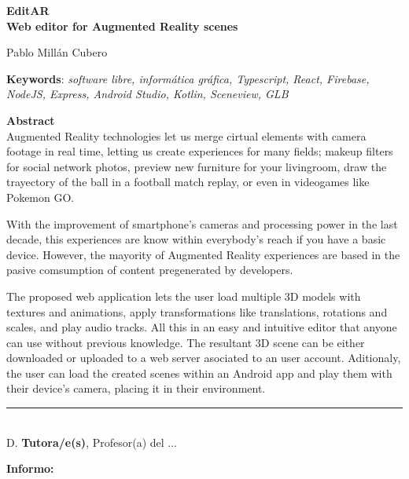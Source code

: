 \cleardoublepage

\begin{center}
	{\large\bfseries EditAR \\ Web editor for Augmented Reality scenes}\\
\end{center}
\begin{center}
	Pablo Millán Cubero\\
\end{center}
\vspace{0.5cm}
\noindent\textbf{Keywords}: \textit{software libre, informática gráfica, Typescript, React, Firebase, NodeJS, Express, Android Studio, Kotlin, Sceneview, GLB}
\vspace{0.7cm}

\noindent\textbf{Abstract}\\
Augmented Reality technologies let us merge cirtual elements with camera footage in real time, letting us create experiences for many fields; makeup filters for social network photos, preview new furniture for your livingroom, draw the trayectory of the ball in a football match replay, or even in videogames like Pokemon GO.

With the improvement of smartphone's cameras and processing power in the last decade, this experiences are know within everybody's reach if you have a basic device. However, the mayority of Augmented Reality experiences are based in the pasive comsumption of content pregenerated by developers.

The proposed web application lets the user load multiple 3D models with textures and animations, apply transformations like translations, rotations and scales, and play audio tracks. All this in an easy and intuitive editor that anyone can use without previous knowledge. The resultant 3D scene can be either downloaded or uploaded to a web server asociated to an user account. Aditionaly, the user can load the created scenes within an Android app and play them with their device's camera, placing it in their environment.


\cleardoublepage

\thispagestyle{empty}

\noindent\rule[-1ex]{\textwidth}{2pt}\\[4.5ex]

D. \textbf{Tutora/e(s)}, Profesor(a) del ...

\vspace{0.5cm}

\textbf{Informo:}

